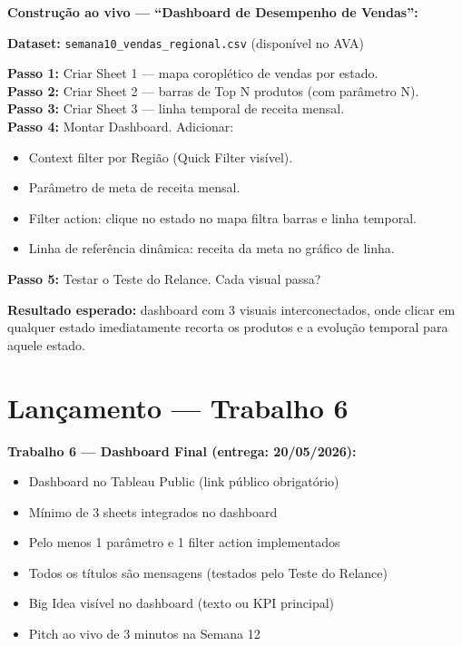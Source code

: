 \begin{SolvedBox}
\textbf{Construção ao vivo — ``Dashboard de Desempenho de Vendas'':}

\textbf{Dataset:} \texttt{semana10\_vendas\_regional.csv} (disponível no AVA)

\textbf{Passo 1:} Criar Sheet 1 — mapa coroplético de vendas por estado.\\
\textbf{Passo 2:} Criar Sheet 2 — barras de Top N produtos (com parâmetro N).\\
\textbf{Passo 3:} Criar Sheet 3 — linha temporal de receita mensal.\\
\textbf{Passo 4:} Montar Dashboard. Adicionar:
\begin{itemize}
  \item Context filter por Região (Quick Filter visível).
  \item Parâmetro de meta de receita mensal.
  \item Filter action: clique no estado no mapa filtra barras e linha temporal.
  \item Linha de referência dinâmica: receita da meta no gráfico de linha.
\end{itemize}
\textbf{Passo 5:} Testar o Teste do Relance. Cada visual passa?

\textbf{Resultado esperado:} dashboard com 3 visuais interconectados, onde
clicar em qualquer estado imediatamente recorta os produtos e a evolução
temporal para aquele estado.
\end{SolvedBox}

\section{Lançamento — Trabalho 6}

\begin{SolvedBox}
\textbf{Trabalho 6 — Dashboard Final (entrega: 20/05/2026):}
\begin{itemize}
  \item[$\square$] Dashboard no Tableau Public (link público obrigatório)
  \item[$\square$] Mínimo de 3 sheets integrados no dashboard
  \item[$\square$] Pelo menos 1 parâmetro e 1 filter action implementados
  \item[$\square$] Todos os títulos são mensagens (testados pelo Teste do Relance)
  \item[$\square$] Big Idea visível no dashboard (texto ou KPI principal)
  \item[$\square$] Pitch ao vivo de 3 minutos na Semana 12
\end{itemize}
\end{SolvedBox}

